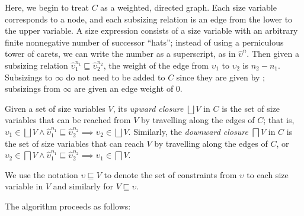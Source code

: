 Here, we begin to treat $C$ as a weighted, directed graph.
Each size variable corresponds to a node, and each subsizing relation is an edge from the lower to the upper variable.
A size expression consists of a size variable with an arbitrary finite nonnegative number of successor ``hats''; instead of using a perniculous tower of carets, we can write the number as a superscript, as in $\hat{\upsilon}^n$.
Then given a subsizing relation $\hat{\upsilon}_1^{n_1} \sqsubseteq \hat{\upsilon}_2^{n_2}$, the weight of the edge from $\upsilon_1$ to $\upsilon_2$ is $n_2 - n_1$.
Subsizings to $\infty$ do not need to be added to $C$ since they are given by ; subsizings from $\infty$ are given an edge weight of $0$.

Given a set of size variables $V$, its \emph{upward closure} $\bigsqcup V$ in $C$ is the set of size variables that can be reached from $V$ by travelling along the edges of $C$; that is, $\upsilon_1 \in \bigsqcup V \wedge \hat{\upsilon}_1^{n_1} \sqsubseteq \hat{\upsilon}_2^{n_2} \implies \upsilon_2 \in \bigsqcup V$.
Similarly, the \emph{downward closure} $\bigsqcap V$ in $C$ is the set of size variables that can reach $V$ by travelling along the edges of $C$, or $\upsilon_2 \in \bigsqcap V \wedge \hat{\upsilon}_1^{n_1} \sqsubseteq \hat{\upsilon}_2^{n_2} \implies \upsilon_1 \in \bigsqcap V$.

We use the notation $\upsilon \sqsubseteq V$ to denote the set of constraints from $\upsilon$ to each size variable in $V$ and similarly for $V \sqsubseteq \upsilon$.

The algorithm proceeds as follows:

